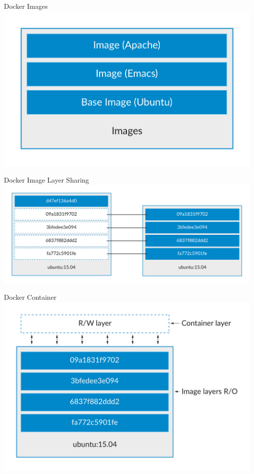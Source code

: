 \documentclass[10pt]{beamer}
\begin{document}
\begin{frame}{Docker Images}
  \includegraphics[width=1\textwidth]{../images/9-docker-image.png}
\end{frame}

\begin{frame}{Docker Image Layer Sharing}
  \includegraphics[width=1\textwidth]{../images/10-docker-image-layer-sharing.png}
\end{frame}

\begin{frame}{Docker Container}
  \includegraphics[width=1\textwidth]{../images/11-docker-container.png}
\end{frame}
\end{document}
